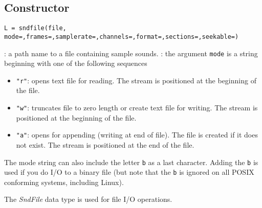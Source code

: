 
\begin{mandesc}
\end{mandesc}

\subsection*{Constructor}
\begin{verbatim}
L = sndfile(file, mode=,frames=,samplerate=,channels=,format=,sections=,seekable=)
\end{verbatim}
\begin{parameters}
  \begin{varlist}
    : a path name to a file containing sample sounds. 
    : the argument \verb+mode+ is a string beginning  with  one  of  the  following  sequences
    \begin{itemize}
      \item \verb+"r"+: opens text file for reading. The stream is positioned at the beginning of the  file.
      \item \verb+"w"+: truncates  file  to  zero  length  or create text file for writing.  The stream is
        positioned at the beginning of the file.
      \item \verb+"a"+: opens for appending (writing at end of file).  The file is created if it does not 
	exist.  The stream is positioned at the end of the file.
    \end{itemize}
    The mode string can also include the letter \verb+b+ as a last character. 
    Adding the \verb+b+ is used if you do I/O to a binary file 
    (but note that the  \verb+b+ is ignored on all POSIX conforming systems, including Linux).
  \end{varlist}
\end{parameters}

\begin{mandescription}
The \emph{SndFile} data type is used for file I/O operations.
\end{mandescription}

